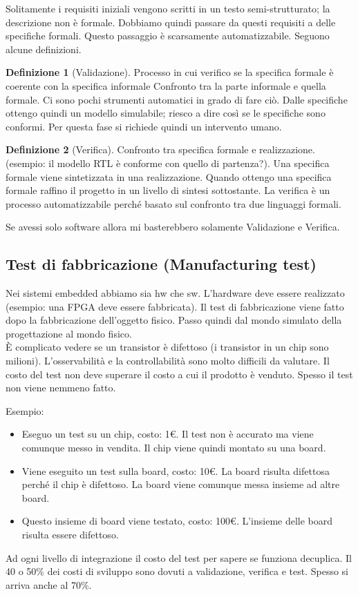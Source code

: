 \documentclass[a4paper]{article}
\theoremstyle{definition}
\newtheorem{dfn}{Definizione}[]
\begin{document}
	
		Solitamente i requisiti iniziali vengono scritti in un testo semi-strutturato; la descrizione non è formale. Dobbiamo quindi passare da questi requisiti a delle specifiche formali. Questo passaggio è scarsamente automatizzabile. Seguono alcune definizioni.
		
		\begin{dfn}[Validazione]
			Processo in cui verifico se la specifica formale è coerente con la specifica informale
			Confronto tra la parte informale e quella formale. Ci sono pochi strumenti automatici in grado di fare ciò. Dalle specifiche ottengo quindi un modello simulabile; riesco a dire così se le specifiche sono conformi. Per questa fase si richiede quindi un intervento umano.
		\end{dfn}
		
		\begin{dfn}[Verifica]
			Confronto tra specifica formale e realizzazione. (esempio: il modello RTL è conforme con quello di partenza?). Una specifica formale viene sintetizzata in una realizzazione. Quando ottengo una specifica formale raffino il progetto in un livello di sintesi sottostante. La verifica è un processo automatizzabile perché basato sul confronto tra due linguaggi formali.
		\end{dfn}
		Se avessi solo software allora mi basterebbero solamente Validazione e Verifica.
	
		\subsection{Test di fabbricazione (Manufacturing test)}
			Nei sistemi embedded abbiamo sia hw che sw. L'hardware deve essere realizzato (esempio: una FPGA deve essere fabbricata). Il test di fabbricazione viene fatto dopo la fabbricazione dell'oggetto fisico. Passo quindi dal mondo simulato della progettazione al mondo fisico. \\
			È complicato vedere se un transistor è difettoso (i transistor in un chip sono milioni). L'osservabilità e la controllabilità sono molto difficili da valutare.
			Il costo del test non deve superare il costo a cui il prodotto è venduto. Spesso il test non viene nemmeno fatto.
		
		Esempio:
		\begin{itemize}
			\item Eseguo un test su un chip, costo: 1€. Il test non è accurato ma viene comunque messo in vendita. Il chip viene quindi montato su una board.
			\item Viene eseguito un test sulla board, costo: 10€. La board risulta difettosa perché il chip è difettoso. La board viene comunque messa insieme ad altre board.
			\item Questo insieme di board viene testato, costo: 100€. L'insieme delle board risulta essere difettoso.
		\end{itemize}
		Ad ogni livello di integrazione il costo del test per sapere se funziona decuplica.
		Il 40 o 50\% dei costi di sviluppo sono dovuti a validazione, verifica e test. Spesso si arriva anche al 70\%. 
		
\end{document}
